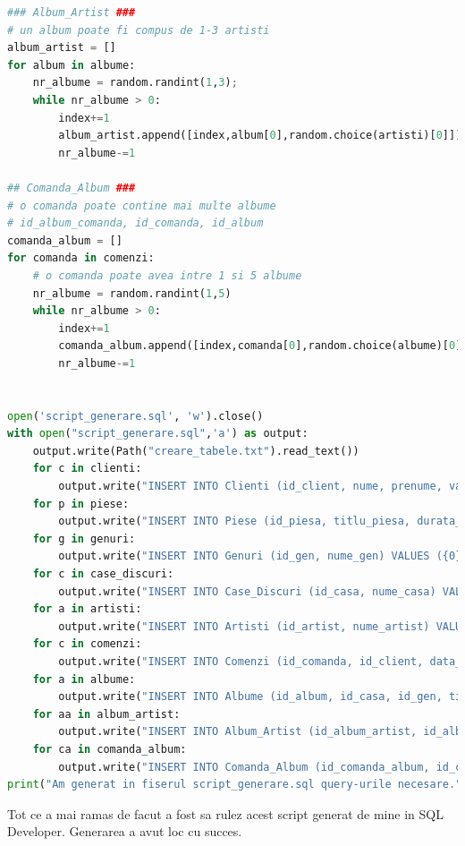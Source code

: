 \documentclass{article}
\begin{document}
\begin{lstlisting}[language=Python, title=Generarea datelor folosind Python]
### Album_Artist ###
# un album poate fi compus de 1-3 artisti
album_artist = []
for album in albume:
    nr_albume = random.randint(1,3);
    while nr_albume > 0:
        index+=1
        album_artist.append([index,album[0],random.choice(artisti)[0]])
        nr_albume-=1

## Comanda_Album ###
# o comanda poate contine mai multe albume
# id_album_comanda, id_comanda, id_album
comanda_album = []
for comanda in comenzi:
    # o comanda poate avea intre 1 si 5 albume
    nr_albume = random.randint(1,5)
    while nr_albume > 0:
        index+=1
        comanda_album.append([index,comanda[0],random.choice(albume)[0]])
        nr_albume-=1


open('script_generare.sql', 'w').close()
with open("script_generare.sql",'a') as output:
    output.write(Path("creare_tabele.txt").read_text())
    for c in clienti:
        output.write("INSERT INTO Clienti (id_client, nume, prenume, varsta) VALUES ({0}, '{1}', '{2}', {3});\n".format(c[0],c[1],c[2],c[3]));
    for p in piese:
        output.write("INSERT INTO Piese (id_piesa, titlu_piesa, durata_piesa) VALUES ({0}, '{1}', {2});\n".format(p[0],p[1],p[2]));
    for g in genuri:
        output.write("INSERT INTO Genuri (id_gen, nume_gen) VALUES ({0}, '{1}');\n".format(g[0],g[1]));
    for c in case_discuri:
        output.write("INSERT INTO Case_Discuri (id_casa, nume_casa) VALUES ({0}, '{1}');\n".format(c[0],c[1]));
    for a in artisti:
        output.write("INSERT INTO Artisti (id_artist, nume_artist) VALUES ({0}, '{1}');\n".format(a[0],a[1]));
    for c in comenzi:
        output.write("INSERT INTO Comenzi (id_comanda, id_client, data_comanda) VALUES ({0}, {1}, TO_DATE('{2}','yyyy-mm-dd hh24:mi:ss'));\n".format(c[0],c[1],c[2]));
    for a in albume:
        output.write("INSERT INTO Albume (id_album, id_casa, id_gen, titlu_album, pret_album, an_aparitie) VALUES ({0}, {1}, {2}, '{3}', {4}, {5});\n".format(a[0],a[1],a[2],a[3],a[4],a[5]))
    for aa in album_artist:
        output.write("INSERT INTO Album_Artist (id_album_artist, id_album, id_artist) VALUES ({0}, {1}, {2});\n".format(aa[0],aa[1],aa[2]))
    for ca in comanda_album:
        output.write("INSERT INTO Comanda_Album (id_comanda_album, id_comanda, id_album) VALUES ({0}, {1}, {2});\n".format(ca[0],ca[1],ca[2]))
print("Am generat in fiserul script_generare.sql query-urile necesare.")
\end{lstlisting}

Tot ce a mai ramas de facut a fost sa rulez acest script generat de mine in SQL Developer. Generarea a avut loc cu succes.
\end{document}
